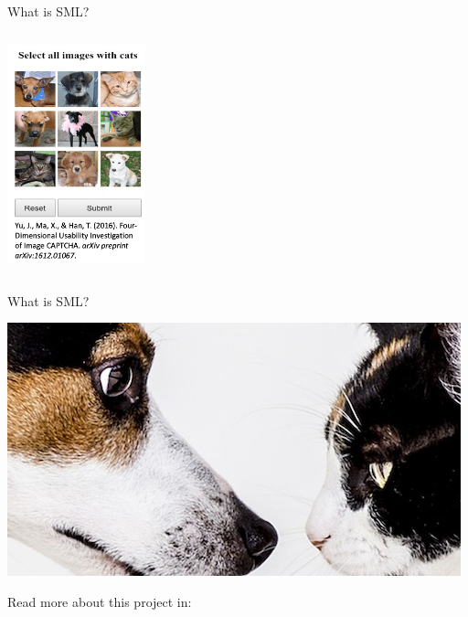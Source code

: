 \documentclass[handout]{beamer}
\begin{document}
	
	\begin{frame}{What is SML?}
		
		\begin{center}
			\includegraphics[width=4cm, height=7cm]{../pictures/CAPTCHA.png} 
		\end{center}
		
		
		
	\end{frame}
	
	
	\begin{frame}{What is SML?}
		
		\begin{center}
			\includegraphics{../pictures/dogvscat.png}
		\end{center}
		
		\begin{tiny}
			Read more about this project in: 
		\end{tiny}
		
		
		
		
	\end{frame}
	
\end{document}
